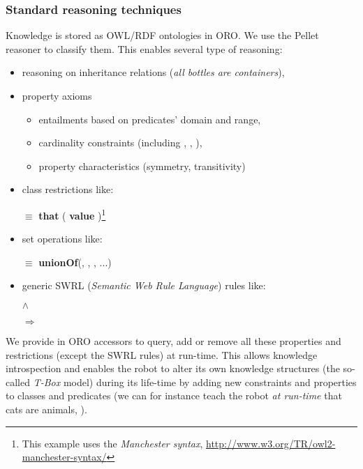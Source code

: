 \subsubsection{Standard reasoning techniques}


Knowledge is stored as OWL/RDF ontologies in ORO. We use the Pellet reasoner to
classify them. This enables several type of reasoning:

\begin{itemize}
	\item reasoning on inheritance relations (\eg \emph{all bottles are containers}),
	\item property axioms
		\begin{itemize}
		\item entailments based on predicates' domain and range,
		\item cardinality constraints (including , 
		, ),
		\item property characteristics (symmetry, transitivity)
		\end{itemize}
	\item class restrictions like: \par \footnotesize {} $\equiv$
		 {\bf that} ( {\bf value}
		)\footnote{This example uses the \emph{Manchester
		syntax}, \url{http://www.w3.org/TR/owl2-manchester-syntax/}} \normalsize
	\item set operations like: \par \footnotesize {} $\equiv$ {\bf unionOf}(,
		, , ...) \normalsize
	\item generic SWRL ({\em Semantic Web Rule Language}) rules like: \par
		\footnotesize {} $\land$
		 \par $\Rightarrow$ 
		\normalsize 
	\end{itemize}

We provide in ORO accessors to query, add or remove all these properties and
restrictions (except the SWRL rules) at run-time. This allows knowledge
introspection and enables the robot to alter its own knowledge structures (the
so-called \emph{T-Box} model) during its life-time by adding new constraints
and properties to classes and predicates (we can for instance teach the robot
\emph{at run-time} that cats are animals, \ie {}).



